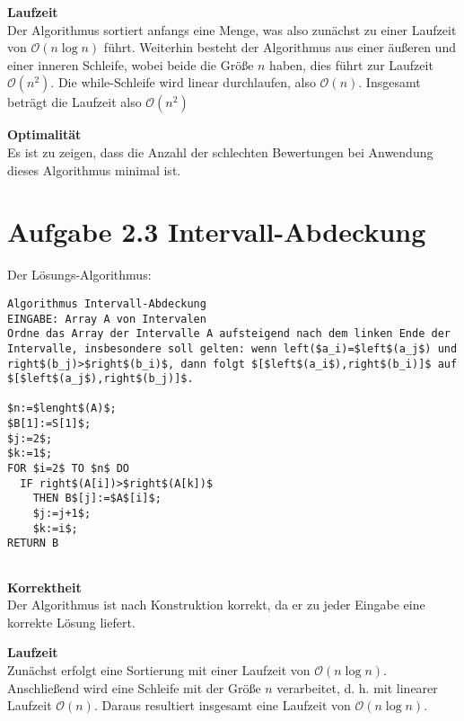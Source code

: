 \documentclass[a4paper, fontsize=10pt]{scrartcl}
\begin{document}
\textbf{Laufzeit}\\
Der Algorithmus sortiert anfangs eine Menge, was also zunächst zu einer Laufzeit von $\mathcal{O}(n\log n)$ führt. Weiterhin besteht der Algorithmus aus einer äußeren und einer inneren Schleife, wobei beide die Größe $n$ haben, dies führt zur Laufzeit $\mathcal{O}(n^2)$. Die while-Schleife wird linear durchlaufen, also $\mathcal{O}(n)$. Insgesamt beträgt die Laufzeit also $\mathcal{O}(n^2)$\bigskip


\textbf{Optimalität}\\
Es ist zu zeigen, dass die Anzahl der schlechten Bewertungen bei Anwendung dieses Algorithmus minimal ist.
\newpage

\section*{Aufgabe 2.3 Intervall-Abdeckung}

Der Lösungs-Algorithmus:
\begin{lstlisting}[mathescape]
Algorithmus Intervall-Abdeckung
EINGABE: Array A von Intervalen
Ordne das Array der Intervalle A aufsteigend nach dem linken Ende der Intervalle, insbesondere soll gelten: wenn left($a_i)=$left$(a_j$) und right$(b_j)>$right$(b_i)$, dann folgt $[$left$(a_i$),right$(b_i)]$ auf $[$left$(a_j$),right$(b_j)]$. 

$n:=$lenght$(A)$;
$B[1]:=S[1]$;
$j:=2$;
$k:=1$;
FOR $i=2$ TO $n$ DO
  IF right$(A[i])>$right$(A[k])$
    THEN B$[j]:=$A$[i]$;
    $j:=j+1$;
    $k:=i$;
RETURN B


\end{lstlisting}



\textbf{Korrektheit}\\
Der Algorithmus ist nach Konstruktion korrekt, da er zu jeder Eingabe eine korrekte Lösung liefert.\bigskip

\textbf{Laufzeit}\\
Zunächst erfolgt eine Sortierung mit einer Laufzeit von $\mathcal{O}(n\log n)$. Anschließend wird eine Schleife mit der Größe $n$ verarbeitet, d. h. mit linearer Laufzeit $\mathcal{O}(n)$. Daraus resultiert insgesamt eine Laufzeit von $\mathcal{O}(n\log n)$.
\end{document}
